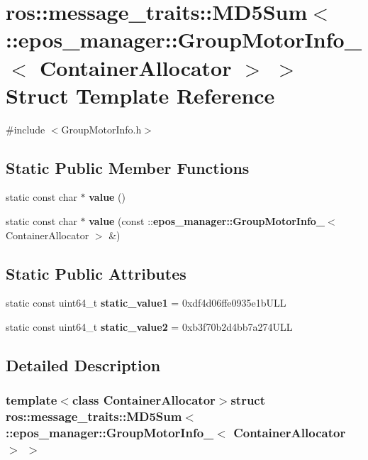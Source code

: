 \section{ros\-:\-:message\-\_\-traits\-:\-:\-M\-D5\-Sum$<$ \-:\-:epos\-\_\-manager\-:\-:\-Group\-Motor\-Info\-\_\-$<$ \-Container\-Allocator $>$ $>$ \-Struct \-Template \-Reference}
\label{structros_1_1message__traits_1_1MD5Sum_3_01_1_1epos__manager_1_1GroupMotorInfo___3_01ContainerAllocator_01_4_01_4}


{\ttfamily \#include $<$\-Group\-Motor\-Info.\-h$>$}

\subsection*{\-Static \-Public \-Member \-Functions}
\begin{DoxyCompactItemize}
\item 
static const char $\ast$ {\bf value} ()
\item 
static const char $\ast$ {\bf value} (const \-::{\bf epos\-\_\-manager\-::\-Group\-Motor\-Info\-\_\-}$<$ \-Container\-Allocator $>$ \&)
\end{DoxyCompactItemize}
\subsection*{\-Static \-Public \-Attributes}
\begin{DoxyCompactItemize}
\item 
static const uint64\-\_\-t {\bf static\-\_\-value1} = 0xdf4d06ffe0935e1b\-U\-L\-L
\item 
static const uint64\-\_\-t {\bf static\-\_\-value2} = 0xb3f70b2d4bb7a274\-U\-L\-L
\end{DoxyCompactItemize}


\subsection{\-Detailed \-Description}
\subsubsection*{template$<$class Container\-Allocator$>$struct ros\-::message\-\_\-traits\-::\-M\-D5\-Sum$<$ \-::epos\-\_\-manager\-::\-Group\-Motor\-Info\-\_\-$<$ Container\-Allocator $>$ $>$}



